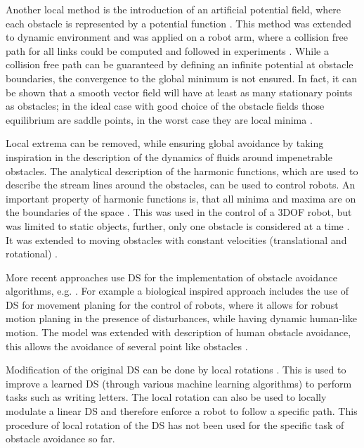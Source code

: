 Another local method is the introduction of an artificial potential field, where each obstacle is represented by a potential function \cite{rimon1992exact}. This  method was extended to dynamic environment and was applied on a robot arm, where a collision free path for all links could be computed and followed in experiments \cite{khatib1986real}. While a collision free path can be guaranteed by defining an infinite potential at obstacle boundaries, the convergence to the global minimum is not ensured. In fact, it can be shown that a smooth vector field will have at least as many stationary points as obstacles; in the ideal case with good choice of the obstacle fields those equilibrium are saddle points, in the worst case they are local minima \cite{koditschek1990robot}.

Local extrema can be removed, while ensuring global avoidance by taking inspiration in the description of the dynamics of fluids around impenetrable obstacles. The analytical description of the harmonic functions, which are used to describe the stream lines around the obstacles, can be used to control robots. An important property of harmonic functions is, that all minima and maxima are on the boundaries of the space \cite{kim1992real}. This was used in the control of a 3DOF robot, but was limited to static objects, further, only one obstacle is considered at a time \cite{guldner1993sliding}. It was extended to moving obstacles with constant velocities (translational and rotational) \cite{feder1997real}.

More recent approaches use DS for the implementation of obstacle avoidance algorithms, e.g. \cite{ijspeert2002movement,khansari2012dynamical}. For example a biological inspired approach includes the use of DS for movement planing for the control of robots, where it allows for robust motion planing in the presence of disturbances, while having dynamic human-like motion. The model was extended with description of human obstacle avoidance,  this allows the avoidance of several point like obstacles \cite{hoffmann2009biologically}.

Modification of the original DS can be done by local rotations \cite{kronander2015incremental}. This is used to improve a learned DS (through various machine learning algorithms) to perform tasks such as writing letters. The local rotation can also be used to locally modulate a linear DS and therefore enforce a robot to follow a specific path. This procedure of local rotation of the DS has not been used for the specific task of obstacle avoidance so far.

